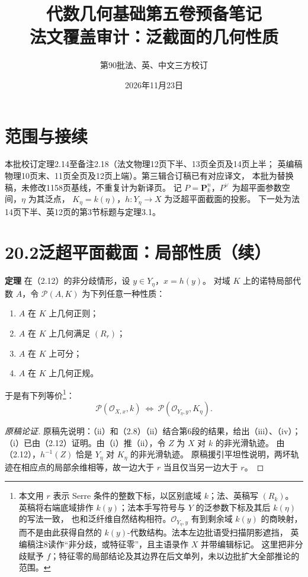 \documentclass[openany,fontset=fandol]{ctexbook}
\newcommand{\OO}{\mathcal O}
\newcommand{\PP}{\mathbf P}
\newcommand{\tagitem}[2]{\par\medskip\noindent\textbf{#1\quad #2}\enspace}
\begin{document}
\title{代数几何基础第五卷预备笔记\\法文覆盖审计：泛截面的几何性质}
\author{第90批\quad 法、英、中文三方校订}
\date{2026年11月23日}
\maketitle

\section*{范围与接续}
本批校订定理2.14至备注2.18（法文物理12页下半、13页全页及14页上半；
英编稿物理10页末、11页全页及12页上端）。第三辑合订稿已有对应译文，
本批为替换稿，未修改1158页基线，不重复计为新译页。
记 $P=\PP^n_k$，$P^\vee$ 为超平面参数空间，$\eta$ 为其泛点，
$K_\eta=k(\eta)$，$h:Y_\eta\to X$ 为泛超平面截面的投影。
下一处为法14页下半、英12页的第3节标题与定理3.1。

\section*{20.2\quad 泛超平面截面：局部性质（续）}
\tagitem{定理}{2.14}
在（2.12）的非分歧情形，设 $y\in Y_\eta$，$x=h(y)$。
对域 $K$ 上的诺特局部代数 $A$，令 $\mathcal P(A,K)$ 为下列任意一种性质：
\begin{enumerate}
 \item[(i)] $A$ 在 $K$ 上几何正则；
 \item[(ii)] $A$ 在 $K$ 上几何满足 $(R_r)$；
 \item[(iii)] $A$ 在 $K$ 上可分；
 \item[(iv)] $A$ 在 $K$ 上几何正规。
\end{enumerate}
于是有下列等价\footnote{本文用 $r$ 表示 Serre 条件的整数下标，以区别底域 $k$；法、英稿写 $(R_k)$。
英稿将右端底域排作 $k(y)$；法本手写符号与 $Y$ 的泛参数下标及其后 $k(\eta)$ 的写法一致，
也和泛纤维自然结构相符。$\OO_{Y_\eta,y}$ 有到剩余域 $k(y)$ 的商映射，
而不是由此获得自然的 $k(y)$-代数结构。法本左边批语受扫描阴影遮挡，
英编稿注8读作“非分歧，或特征零”，且主语录作 $X$ 并带编辑标记。
这里把非分歧赋予 $f$；特征零的局部结论及其边界在后文单列，未以边批扩大全部推论的范围。}：
\[
 \mathcal P(\OO_{X,x},k)\ \Longleftrightarrow\
 \mathcal P(\OO_{Y_\eta,y},K_\eta).
\]
\begin{proof}[原稿论证]
原稿先说明：（ii）和（2.8）（ii）结合第6段的结果，给出（iii）、（iv）；
（i）已由（2.12）证明。由（i）推（ii），令 $Z$ 为 $X$ 对 $k$ 的非光滑轨迹。
由（2.12），$h^{-1}(Z)$ 恰是 $Y_\eta$ 对 $K_\eta$ 的非光滑轨迹。
原稿援引平坦性说明，两坏轨迹在相应点的局部余维相等，故一边大于 $r$ 当且仅当另一边大于 $r$。
\end{proof}
\end{document}
